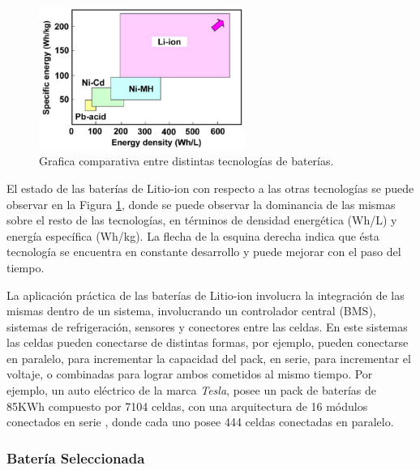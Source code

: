 \documentclass[10pt,a4paper]{article}
\begin{document}
    \begin{figure}[h!]
        \begin{center}
            \includegraphics[width=0.6\textwidth]{comparisson-liion.png}
            \caption{Grafica comparativa entre distintas
            tecnologías de baterías.}
            \label{comparisson_batt}
        \end{center}
    \end{figure}
    \FloatBarrier

    \noindent El estado de las baterías de Litio-ion con respecto a las otras 
    tecnologías se puede observar en la Figura \ref{comparisson_batt}, donde se 
    puede observar la dominancia de las mismas sobre el resto de las 
    tecnologías, en términos de densidad energética (Wh/L) y energía específica 
    (Wh/kg). La flecha de la esquina derecha indica que ésta tecnología se 
    encuentra en constante desarrollo y puede mejorar con el paso del tiempo.

	\noindent La aplicación práctica de las baterías de Litio-ion involucra la 
    integración de las mismas dentro de un sistema, involucrando un controlador 
    central (\acrshort{BMS}), sistemas de refrigeración, sensores y conectores entre las 
    celdas. En este sistemas las celdas pueden conectarse de distintas 
    formas, por ejemplo, pueden conectarse en paralelo, para incrementar la 
    capacidad del pack, en serie, para incrementar el voltaje, o combinadas 
    para lograr ambos cometidos al mismo tiempo. Por ejemplo, un auto eléctrico 
    de la marca \emph{Tesla}, posee un pack de baterías de 85KWh compuesto por 
    7104 celdas, con una arquitectura de 16 módulos conectados en serie
    , donde cada uno posee 444 celdas conectadas en paralelo.

    \subsubsection{Batería Seleccionada}\label{batSel}
\end{document}
